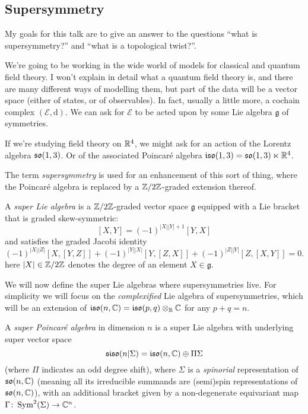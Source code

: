 

\subsection{Supersymmetry}
My goals for this talk are to give an answer to the questions ``what is supersymmetry?'' and ``what is a topological twist?''.

We're going to be working in the wide world of models for classical and quantum field theory.  I won't explain in detail what a quantum field theory is, and there are many different ways of modelling them, but part of the data will be a vector space (either of states, or of observables).  In fact, usually a little more, a cochain complex $(\mathcal E, \mathrm{d})$.  We can ask for $\mathcal E$ to be acted upon by some Lie algebra $\mathfrak{g}$ of symmetries.
\begin{example} If we're studying field theory on $\mathbb{R}^4$, we might ask for an action of the Lorentz algebra $\mathfrak{so}(1,3)$.  Or of the associated Poincar\'e algebra $\mathfrak{iso}(1,3) = \mathfrak{so}(1,3) \ltimes \mathbb{R}^4$. \end{example}

The term \emph{supersymmetry} is used for an enhancement of this sort of thing, where the Poincar\'e algebra is replaced by a $\mathbb{Z}/2\mathbb{Z}$-graded extension thereof.
\begin{Definition}
	A \emph{super Lie algebra} is a $\mathbb{Z}/2\mathbb{Z}$-graded vector space $\mathfrak{g}$ equipped with a Lie bracket that is graded skew-symmetric:
	\[[X,Y] = (-1)^{|X||Y|+1}[Y,X]\]
	and satisfies the graded Jacobi identity
	\[(-1)^{|X||Z|}[X,[Y,Z]] + (-1)^{|Y||X|}[Y,[Z,X]] + (-1)^{|Z||Y|}[Z,[X,Y]] = 0.\]
	here $|X| \in \mathbb{Z}/2\mathbb{Z}$ denotes the degree of an element $X \in \mathfrak{g}$.
\end{Definition}
We will now define the super Lie algebras where supersymmetries live.  For simplicity we will focus on the \emph{complexified} Lie algebra of supersymmetries, which will be an extension of $\mathfrak{iso}(n,\mathbb{C}) = \mathfrak{iso}(p,q) \otimes_{\mathbb{R}} \mathbb{C}$ for any $p+q=n$.
\begin{Definition}
	A \emph{super Poincar\'e algebra} in dimension $n$ is a super Lie algebra with underlying super vector space
	\[\mathfrak{siso}(n|\Sigma) = \mathfrak{iso}(n,\mathbb{C}) \oplus \Pi \Sigma\]
	(where $\Pi$ indicates an odd degree shift), where $\Sigma$ is a \emph{spinorial} representation of $\mathfrak{so}(n,\mathbb{C})$ (meaning all its irreducible summands are (semi)spin representations of $\mathfrak{so}(n,\mathbb{C})$), with an additional bracket given by a non-degenerate equivariant map $\Gamma \colon \operatorname{Sym}^2(\Sigma) \to \mathbb{C}^n$.
\end{Definition}

